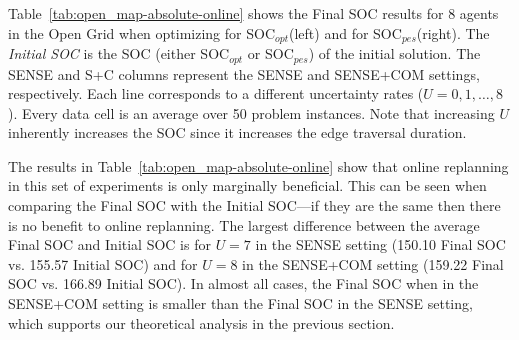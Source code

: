 \documentclass[jair,twoside,11pt,theapa]{article}
\newcommand{\sense}{SENSE\xspace}
\newcommand{\sensecom}{SENSE+COM\xspace}
\newcommand{\socopt}{SOC$_{opt}$\xspace}
\newcommand{\socpes}{SOC$_{pes}$\xspace}
\begin{document}
Table~\ref{tab:open_map-absolute-online} shows the Final SOC results for 8 agents in the Open Grid when optimizing for \socopt (left) and for \socpes (right). 
The \emph{Initial SOC} is the SOC (either \socopt or \socpes) of the initial solution. 
The \sense and S+C columns represent the \sense and \sensecom settings, respectively. 
Each line corresponds to a different uncertainty rates ($U=0,1,\dots,8$).
Every data cell is an average over 50 problem instances. 
Note that increasing $U$ inherently increases the SOC since it increases the edge traversal duration.

The results in Table~\ref{tab:open_map-absolute-online} show that online replanning in this set of experiments is only marginally beneficial. 
This can be seen when comparing the Final SOC with the Initial SOC---if they are the same then there is no benefit to online replanning. 
The largest difference between the average Final SOC and Initial SOC is for $U=7$ in the \sense setting (150.10 Final SOC vs. 155.57 Initial SOC) and for $U=8$ in the \sensecom setting (159.22 Final SOC vs. 166.89 Initial SOC). 
In almost all cases, the Final SOC when in the \sensecom setting is smaller than the Final SOC in the \sense setting, which supports our theoretical analysis in the previous section. 
\end{document}
